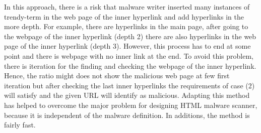 In this approach, there is a risk that malware writer inserted many instances of trendy-term in the web page of the inner hyperlink and add hyperlinks in the more depth. For example, there are hyperlinks in the main page, after going to the webpage of the inner hyperlink (depth 2) there are also hyperlinks in the web page of the inner hyperlink (depth 3). However, this process has to end at some point and there is webpage with no inner link at the end. To avoid this problem, there is iteration for the finding and checking the webpage of the inner hyperlink. Hence, the ratio might does not show the malicious web page at few first iteration but after checking the last inner hyperlinks the requirements of case (2) will satisfy and the given URL will identify as malicious. Adapting this method has helped to overcome the major problem for designing HTML malware scanner, because it is independent of the malware definition. In additions, the method is fairly fast.  
